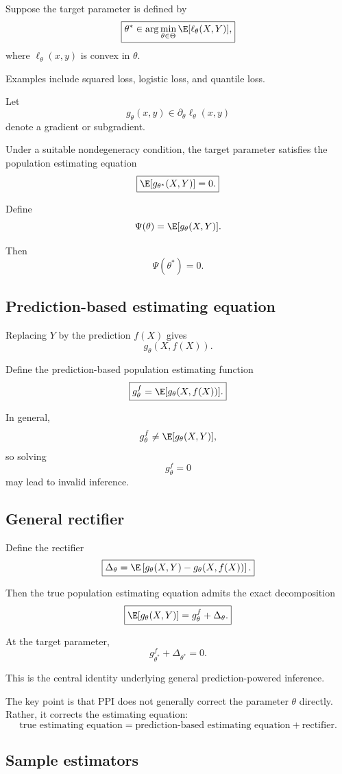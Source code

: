 Suppose the target parameter is defined by
\[
\boxed{
\theta^*
\in
\arg\min_{\theta\in\Theta}
\E[\ell_\theta(X,Y)],
}
\]
where $\ell_\theta(x,y)$ is convex in $\theta$.

Examples include squared loss, logistic loss, and quantile loss.

Let
\[
g_\theta(x,y)
\in
\partial_\theta \ell_\theta(x,y)
\]
denote a gradient or subgradient.

Under a suitable nondegeneracy condition, the target parameter satisfies
the population estimating equation
\[
\boxed{
\E[g_{\theta^*}(X,Y)]=0.
}
\]

Define
\[
\Psi(\theta)
=
\E[g_\theta(X,Y)].
\]

Then
\[
\Psi(\theta^*)=0.
\]

\subsection{Prediction-based estimating equation}

Replacing $Y$ by the prediction $f(X)$ gives
\[
g_\theta(X,f(X)).
\]

Define the prediction-based population estimating function
\[
\boxed{
g_\theta^f
=
\E[g_\theta(X,f(X))].
}
\]

In general,
\[
g_\theta^f
\neq
\E[g_\theta(X,Y)],
\]
so solving
\[
g_\theta^f=0
\]
may lead to invalid inference.

\subsection{General rectifier}

Define the rectifier
\[
\boxed{
\Delta_\theta
=
\E\left[
g_\theta(X,Y)
-
g_\theta(X,f(X))
\right].
}
\]

Then the true population estimating equation admits the exact
decomposition
\[
\boxed{
\E[g_\theta(X,Y)]
=
g_\theta^f
+
\Delta_\theta.
}
\]

At the target parameter,
\[
\boxed{
g_{\theta^*}^f
+
\Delta_{\theta^*}
=
0.
}
\]

This is the central identity underlying general prediction-powered
inference.

The key point is that PPI does not generally correct the parameter
$\theta$ directly. Rather, it corrects the estimating equation:
\[
\boxed{
\text{true estimating equation}
=
\text{prediction-based estimating equation}
+
\text{rectifier}.
}
\]

\subsection{Sample estimators}

